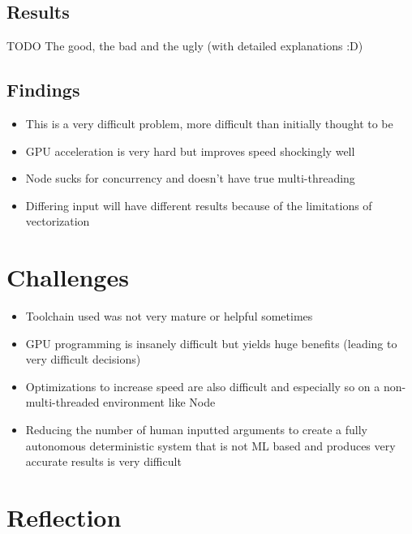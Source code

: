 \documentclass[12pt]{article}
\begin{document}
    \subsection{Results}\label{subsec:results}

    TODO
    \linebreak
    The good, the bad and the ugly (with detailed explanations :D)

    \subsection{Findings}\label{subsec:findings}

    \begin{itemize}
        \item This is a very difficult problem, more difficult than initially thought to be
        \item GPU acceleration is very hard but improves speed shockingly well
        \item Node sucks for concurrency and doesn't have true multi-threading
        \item Differing input will have different results because of the limitations of vectorization
    \end{itemize}

    \pagebreak


    \section{Challenges}\label{sec:challenges}

    \begin{itemize}
        \item Toolchain used was not very mature or helpful sometimes
        \item GPU programming is insanely difficult but yields huge benefits (leading to very difficult decisions)
        \item Optimizations to increase speed are also difficult and especially so on a non-multi-threaded environment like Node
        \item Reducing the number of human inputted arguments to create a fully autonomous deterministic system that is not ML based and produces very accurate results is very difficult
    \end{itemize}

    \pagebreak


    \section{Reflection}\label{sec:reflection}
\end{document}
